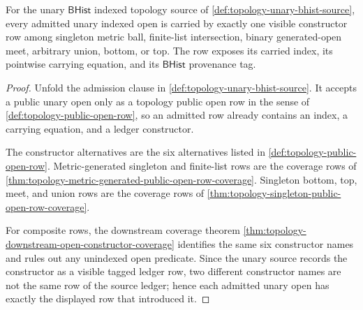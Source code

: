 \begin{theorem}
\label{thm:topology-unary-constructor-ledger-coverage}
For the unary $\mathsf{BHist}$ indexed topology source of \autoref{def:topology-unary-bhist-source}, every admitted unary indexed open is carried by exactly one visible constructor row among singleton metric ball, finite-list intersection, binary generated-open meet, arbitrary union, bottom, or top. The row exposes its carried index, its pointwise carrying equation, and its $\mathsf{BHist}$ provenance tag.
\end{theorem}
\begin{proof}
Unfold the admission clause in \autoref{def:topology-unary-bhist-source}. It accepts a public unary open only as a topology public open row in the sense of \autoref{def:topology-public-open-row}, so an admitted row already contains an index, a carrying equation, and a ledger constructor.

The constructor alternatives are the six alternatives listed in \autoref{def:topology-public-open-row}. Metric-generated singleton and finite-list rows are the coverage rows of \autoref{thm:topology-metric-generated-public-open-row-coverage}. Singleton bottom, top, meet, and union rows are the coverage rows of \autoref{thm:topology-singleton-public-open-row-coverage}.

For composite rows, the downstream coverage theorem \autoref{thm:topology-downstream-open-constructor-coverage} identifies the same six constructor names and rules out any unindexed open predicate. Since the unary source records the constructor as a visible tagged ledger row, two different constructor names are not the same row of the source ledger; hence each admitted unary open has exactly the displayed row that introduced it.
\end{proof}

